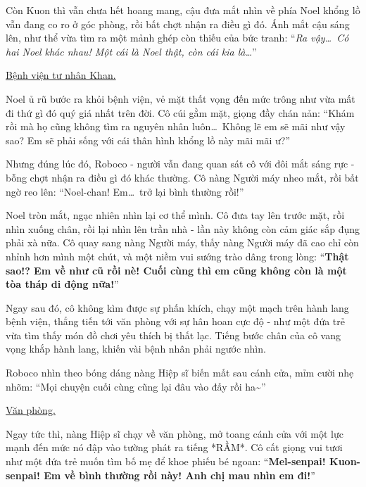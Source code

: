 \documentclass[../main.tex]{subfiles}
\begin{document}
Còn Kuon thì vẫn chưa hết hoang mang, cậu đưa mắt nhìn về phía Noel khổng lồ vẫn đang co ro ở góc phòng, rồi bất chợt nhận ra điều gì đó. Ánh mắt cậu sáng lên, như thể vừa tìm ra một mảnh ghép còn thiếu của bức tranh: ``\textit{Ra vậy\dots\ Có hai Noel khác nhau! Một cái là Noel thật, còn cái kia là\dots}''

\begin{center}
  \uline{Bệnh viện tư nhân Khan.}
\end{center}

Noel ủ rũ bước ra khỏi bệnh viện, vẻ mặt thất vọng đến mức trông như vừa mất đi thứ gì đó quý giá nhất trên đời. Cô cúi gằm mặt, giọng đầy chán nản: ``Khám rồi mà họ cũng không tìm ra nguyên nhân luôn\dots\ Không lẽ em sẽ mãi như vậy sao? Em sẽ phải sống với cái thân hình khổng lồ này mãi mãi ư?''

Nhưng đúng lúc đó, Roboco - người vẫn đang quan sát cô với đôi mắt sáng rực - bỗng chợt nhận ra điều gì đó khác thường. Cô nàng Người máy nheo mắt, rồi bất ngờ reo lên: ``Noel-chan! Em\dots\ trở lại bình thường rồi!''


Noel tròn mắt, ngạc nhiên nhìn lại cơ thể mình. Cô đưa tay lên trước mặt, rồi nhìn xuống chân, rồi lại nhìn lên trần nhà - lần này không còn cảm giác sắp đụng phải xà nữa. Cô quay sang nàng Người máy, thấy nàng Người máy đã cao chỉ còn nhỉnh hơn mình một chút, và một niềm vui sướng trào dâng trong lòng: ``\textbf{Thật sao!? Em về như cũ rồi nè! Cuối cùng thì em cũng không còn là một tòa tháp di động nữa!}''

Ngay sau đó, cô không kìm được sự phấn khích, chạy một mạch trên hành lang bệnh viện, thẳng tiến tới văn phòng với sự hân hoan cực độ - như một đứa trẻ vừa tìm thấy món đồ chơi yêu thích bị thất lạc. Tiếng bước chân của cô vang vọng khắp hành lang, khiến vài bệnh nhân phải ngước nhìn.

Roboco nhìn theo bóng dáng nàng Hiệp sĩ biến mất sau cánh cửa, mỉm cười nhẹ nhõm: ``Mọi chuyện cuối cùng cũng lại đâu vào đấy rồi ha\~{}''

\begin{center}
  \uline{Văn phòng.}
\end{center}

Ngay tức thì, nàng Hiệp sĩ chạy về văn phòng, mở toang cánh cửa với một lực mạnh đến mức nó đập vào tường phát ra tiếng *RẦM*. Cô cất giọng vui tươi như một đứa trẻ muốn tìm bố mẹ để khoe phiếu bé ngoan: ``\textbf{Mel-senpai! Kuon-senpai! Em về bình thường rồi này! Anh chị mau nhìn em đi!}''
\end{document}
